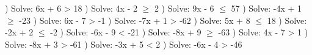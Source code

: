 \documentclass{article}%
\begin{document}
\newline%
\newline%
) Solve: 6x + 6 > 18%
\newline%
\newline%
) Solve: 4x - 2 $\geq$ 2%
\newline%
\newline%
) Solve: 9x - 6 $\leq$ 57%
\newline%
\newline%
) Solve: -4x + 1 $\geq$ -23%
\newline%
\newline%
) Solve: 6x - 7 > -1%
\newline%
\newline%
) Solve: -7x + 1 > -62%
\newline%
\newline%
) Solve: 5x + 8 $\leq$ 18%
\newline%
\newline%
) Solve: -2x + 2 $\leq$ -2%
\newline%
\newline%
) Solve: -6x - 9 < -21%
\newline%
\newline%
) Solve: -8x + 9 $\geq$ -63%
\newline%
\newline%
) Solve: 4x - 7 > 1%
\newline%
\newline%
) Solve: -8x + 3 > -61%
\newline%
\newline%
) Solve: -3x + 5 < 2%
\newline%
\newline%
) Solve: -6x - 4 > -46%
\newline%
\newline%
\newline%
\end{document}
